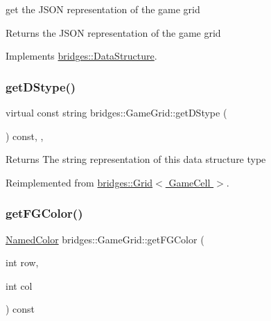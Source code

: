 get the J\+S\+ON representation of the game grid

\begin{DoxyReturn}{Returns}
the J\+S\+ON representation of the game grid 
\end{DoxyReturn}


Implements \hyperlink{classbridges_1_1_data_structure}{bridges\+::\+Data\+Structure}.

\mbox{\label{classbridges_1_1_game_grid_a668f4f82739798f808a9f0b582d49dac}} 
\subsubsection{\texorpdfstring{get\+D\+Stype()}{getDStype()}}
{\footnotesize\ttfamily virtual const string bridges\+::\+Game\+Grid\+::get\+D\+Stype (\begin{DoxyParamCaption}{ }\end{DoxyParamCaption}) const\hspace{0.3cm}{\ttfamily [inline]}, {\ttfamily [override]}, {\ttfamily [virtual]}}

\begin{DoxyReturn}{Returns}
The string representation of this data structure type 
\end{DoxyReturn}


Reimplemented from \hyperlink{classbridges_1_1_grid_ab701d081de4f7ffafb15966758dd5446}{bridges\+::\+Grid$<$ Game\+Cell $>$}.

\mbox{\label{classbridges_1_1_game_grid_af67d9a674e35ed54fff39cd4b0c6ce3a}} 
\subsubsection{\texorpdfstring{get\+F\+G\+Color()}{getFGColor()}}
{\footnotesize\ttfamily \hyperlink{namespacebridges_ad811207d8898a7fd6b72a74725e68357}{Named\+Color} bridges\+::\+Game\+Grid\+::get\+F\+G\+Color (\begin{DoxyParamCaption}\item[{int}]{row,  }\item[{int}]{col }\end{DoxyParamCaption}) const\hspace{0.3cm}{\ttfamily [inline]}}

